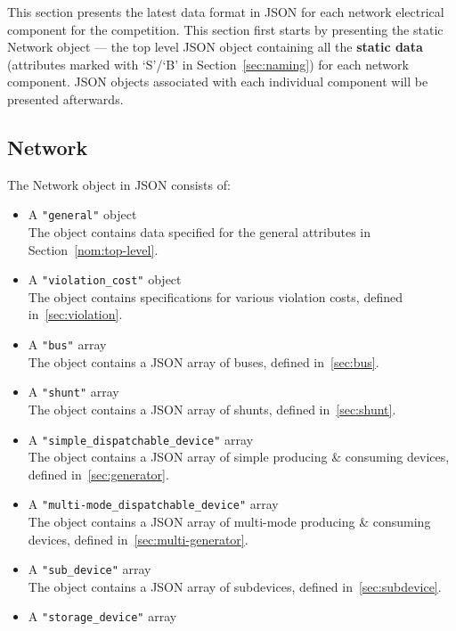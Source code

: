 This section presents the latest data format in JSON for 
each network electrical component for the competition.
This section first starts by presenting the static Network object ---
the top level JSON object containing all the \textbf{static data}
(attributes marked with `S'/`B' in Section~\ref{sec:naming}) for each network component.
JSON objects associated with each individual component will be presented afterwards.

\subsection{Network}
\label{sec:network}
The Network object in JSON consists of: 
\begin{itemize}
    \item A \texttt{"general"} object\\
    The object contains data specified for the general attributes in Section~\ref{nom:top-level}.
    \item A \texttt{"violation\_cost"} object\\
    The object contains specifications for various violation costs, defined in~\ref{sec:violation}.
    \item A \texttt{"bus"} array\\
    The object contains a JSON array of buses, defined in~\ref{sec:bus}.
    \item A \texttt{"shunt"} array\\
    The object contains a JSON array of shunts, defined in~\ref{sec:shunt}.
    \item A \texttt{"simple\_dispatchable\_device"} array\\
    The object contains a JSON array of simple producing \& consuming devices, defined in~\ref{sec:generator}.
    \item A \texttt{"multi-mode\_dispatchable\_device"} array\\
    The object contains a JSON array of multi-mode producing \& consuming devices, defined in~\ref{sec:multi-generator}.
    \item A \texttt{"sub\_device"} array\\
    The object contains a JSON array of subdevices, defined in~\ref{sec:subdevice}.
    \item A \texttt{"storage\_device"} array\\

\end{itemize}
